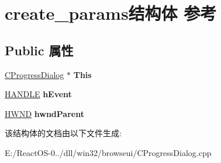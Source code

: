 \hypertarget{structcreate__params}{}\section{create\+\_\+params结构体 参考}
\label{structcreate__params}
\subsection*{Public 属性}
\begin{DoxyCompactItemize}
\item 
\mbox{\label{structcreate__params_a29c718e665e8ef08a83377f9c1674695}} 
\hyperlink{class_c_progress_dialog}{C\+Progress\+Dialog} $\ast$ {\bfseries This}
\item 
\mbox{\label{structcreate__params_a03ba2a4af6fe3251e0f32b100a649115}} 
\hyperlink{interfacevoid}{H\+A\+N\+D\+LE} {\bfseries h\+Event}
\item 
\mbox{\label{structcreate__params_a1644dd31fcacb0918b1c5c94723c17a0}} 
\hyperlink{interfacevoid}{H\+W\+ND} {\bfseries hwnd\+Parent}
\end{DoxyCompactItemize}


该结构体的文档由以下文件生成\+:\begin{DoxyCompactItemize}
\item 
E\+:/\+React\+O\+S-\/0../dll/win32/browseui/C\+Progress\+Dialog.\+cpp\end{DoxyCompactItemize}
